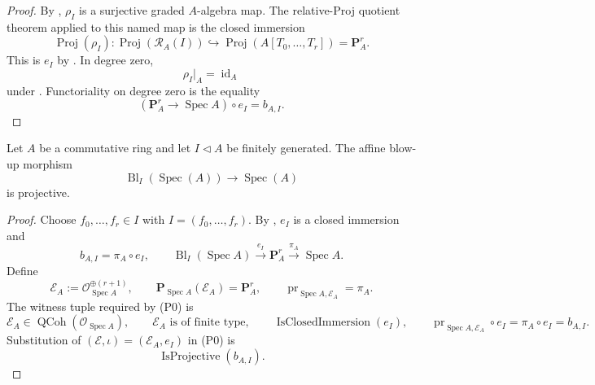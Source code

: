 \begin{proof}
  By , $\rho_I$ is a surjective
  graded $A$-algebra map.  The relative-Proj quotient theorem applied to
  this named map is the closed immersion
  \[
    \operatorname{Proj}(\rho_I)\colon
      \operatorname{Proj}(\mathcal R_A(I))
      \hookrightarrow\operatorname{Proj}(A[T_0,\ldots,T_r])
      =\mathbf P_A^r.
  \]
  This is $e_I$ by
  .  In degree zero,
  \[
    \rho_I|_A=\operatorname{id}_A
  \]
  under .  Functoriality on degree zero
  is the equality
  \[
    (\mathbf P_A^r\to\operatorname{Spec}A)\circ e_I=b_{A,I}.
  \]
\end{proof}


\begin{proposition}
  \label{prop:nagata-affine-blowup-projective}

  Let $A$ be a commutative ring and let $I\triangleleft A$ be finitely
  generated.  The affine blow-up morphism
  \[
    \operatorname{Bl}_I(\operatorname{Spec}(A))
      \longrightarrow\operatorname{Spec}(A)
  \]
  is projective.
\end{proposition}

\begin{proof}
  Choose $f_0,\ldots,f_r\in I$ with $I=(f_0,\ldots,f_r)$.  By
  , $e_I$ is a closed
  immersion and
  \[
    b_{A,I}
      =\pi_A\circ e_I,\qquad
    \operatorname{Bl}_I(\operatorname{Spec}A)
      \xrightarrow{e_I}\mathbf P_A^r
      \xrightarrow{\pi_A}\operatorname{Spec}A.
  \]
  Define
  \[
    \mathcal E_A:=\mathcal O_{\operatorname{Spec}A}^{\oplus(r+1)},
    \qquad
    \mathbf P_{\operatorname{Spec}A}(\mathcal E_A)=\mathbf P_A^r,
    \qquad
    \operatorname{pr}_{\operatorname{Spec}A,\mathcal E_A}=\pi_A.
  \]
  The witness tuple required by (P0) is
  \[
    \mathcal E_A\in\operatorname{QCoh}(\mathcal O_{\operatorname{Spec}A}),
    \qquad
    \mathcal E_A\text{ is of finite type},
    \qquad
    \operatorname{IsClosedImmersion}(e_I),
    \qquad
    \operatorname{pr}_{\operatorname{Spec}A,\mathcal E_A}\circ e_I
      =\pi_A\circ e_I=b_{A,I}.
  \]
  Substitution of $(\mathcal E,\iota)=(\mathcal E_A,e_I)$ in (P0) is
  \[
    \operatorname{IsProjective}(b_{A,I}).
  \]
\end{proof}

